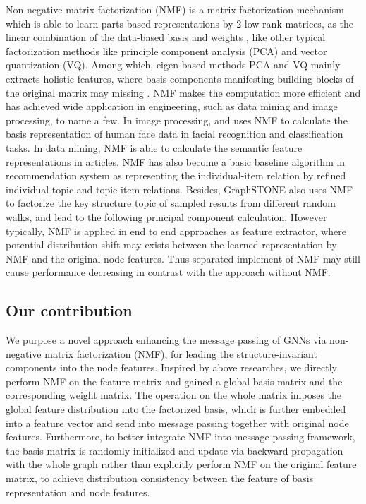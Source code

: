 \documentclass[onecolumn, conference]{IEEEtran}
\begin{document}
Non-negative matrix factorization (NMF) is a matrix factorization mechanism which is able to learn parts-based representations by 2 low rank matrices, as the linear combination of the data-based basis and weights \cite{b3}, like other typical factorization methods like principle component analysis (PCA) and vector quantization (VQ). Among which, eigen-based methods PCA and VQ mainly extracts holistic features, where basis components manifesting building blocks of the original matrix may missing \cite{b4}. 
NMF makes the computation more efficient and has achieved wide application in engineering, such as data mining and image processing, to name a few. In image processing, \cite{b3} and \cite{b4} uses NMF to calculate the basis representation of human face data in facial recognition and classification tasks. In data mining, NMF is able to calculate the semantic feature representations in articles\cite{b3}. NMF has also become a basic baseline algorithm in recommendation system as representing the individual-item relation by refined individual-topic and topic-item relations. Besides, GraphSTONE\cite{b2} also uses NMF to factorize the key structure topic of sampled results from different random walks, and lead to the following principal component calculation. However typically, NMF is applied in end to end approaches as feature extractor,  where potential distribution shift may exists between the learned representation by NMF and the original node features. Thus separated implement of NMF may still cause performance decreasing in contrast with the approach without NMF. 

\subsection{Our contribution}
We purpose a novel approach enhancing the message passing of GNNs via non-negative matrix factorization (NMF), for leading the structure-invariant components into the node features. Inspired by above researches, we directly perform NMF on the feature matrix and gained a global basis matrix and the corresponding weight matrix. The operation on the whole matrix imposes the global feature distribution into the factorized basis, which is further embedded into a feature vector and send into message passing together with original node features. 
Furthermore, to better integrate NMF into message passing framework,  the basis matrix is randomly initialized and update via backward propagation with the whole graph rather than explicitly perform NMF on the original feature matrix, to achieve distribution consistency between the feature of basis representation and node features. 
\end{document}
